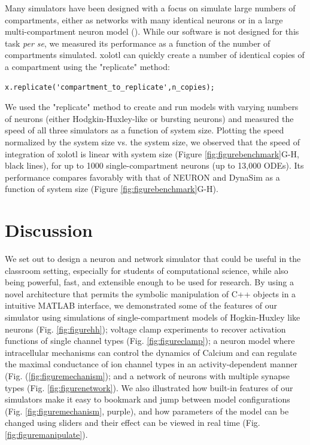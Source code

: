 \documentclass{frontiersSCNS} %
\begin{document}
Many simulators have been designed with a focus on simulate large numbers of compartments, either as networks with many identical neurons or in a large multi-compartment neuron model (\cite{bretteSimulationNetworksSpiking2007, sherfeyDynaSimMATLABToolbox2018, vitayANNarchyCodeGeneration2015, delormeSpikeNETEventdrivenSimulation2003}). While our software is not designed for this task {\em per se}, we measured its performance as a function of the number of compartments simulated. xolotl can quickly create a number of identical copies of a compartment using the "replicate" method: 

\begin{lstlisting}[style=Matlab-editor]
x.replicate('compartment_to_replicate',n_copies); 
\end{lstlisting}

We used the "replicate" method to create and run models with varying numbers of neurons (either Hodgkin-Huxley-like or bursting neurons) and measured the speed of all three simulators as a function of system size. Plotting the speed normalized by the system size vs. the system size, we observed that the speed of integration of xolotl is linear with system size (Figure \ref{fig:figurebenchmark}G-H, black lines), for up to 1000 single-compartment neurons (up to 13,000 ODEs). Its performance compares favorably with that of NEURON and DynaSim as a function of system size (Figure \ref{fig:figurebenchmark}G-H).


%
%
%
%
%
%

\section{Discussion}
\label{discussion}

We set out to design a neuron and network simulator that could be useful in the classroom setting, especially for students of computational science, while also being powerful, fast, and extensible enough to be used for research. By using a novel architecture that permits the symbolic manipulation of C++ objects in a intuitive MATLAB interface, we demonstrated some of the features of our simulator using simulations of single-compartment models of Hogkin-Huxley like neurons (Fig. \ref{fig:figurehh}); voltage clamp experiments to recover activation functions of single channel types (Fig. \ref{fig:figureclamp}); a neuron model where intracellular mechanisms can control the dynamics of Calcium and can regulate the maximal conductance of ion channel types in an activity-dependent manner (Fig. (\ref{fig:figuremechanism}); and a network of neurons with multiple synapse types (Fig. \ref{fig:figurenetwork}). We also illustrated how built-in features of our simulators make it easy to bookmark and jump between model configurations (Fig. \ref{fig:figuremechanism}, purple), and how parameters of the model can be changed using sliders and their effect can be viewed in real time (Fig. \ref{fig:figuremanipulate}). 
\end{document}
